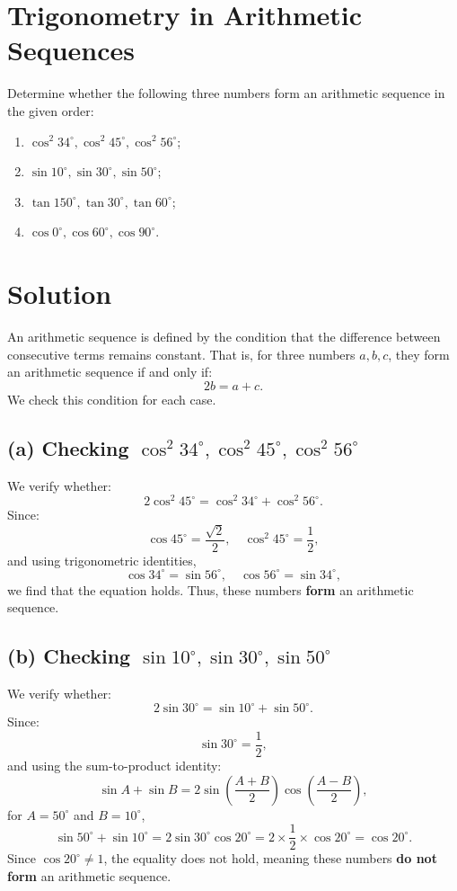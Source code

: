 \documentclass{article}
\begin{document}
\section*{Trigonometry in Arithmetic Sequences}
Determine whether the following three numbers form an arithmetic sequence in the given order:

\begin{enumerate}
    \item $\cos^2 34^\circ, \cos^2 45^\circ, \cos^2 56^\circ$;
    \item $\sin 10^\circ, \sin 30^\circ, \sin 50^\circ$;
    \item $\tan 150^\circ, \tan 30^\circ, \tan 60^\circ$;
    \item $\cos 0^\circ, \cos 60^\circ, \cos 90^\circ$.
\end{enumerate}

\section*{Solution}
An arithmetic sequence is defined by the condition that the difference between consecutive terms remains constant. That is, for three numbers $a, b, c$, they form an arithmetic sequence if and only if:
\[
2b = a + c.
\]
We check this condition for each case.

\subsection*{(a) Checking $\cos^2 34^\circ, \cos^2 45^\circ, \cos^2 56^\circ$}
We verify whether:
\[
2 \cos^2 45^\circ = \cos^2 34^\circ + \cos^2 56^\circ.
\]
Since:
\[
\cos 45^\circ = \frac{\sqrt{2}}{2}, \quad \cos^2 45^\circ = \frac{1}{2},
\]
and using trigonometric identities,
\[
\cos 34^\circ = \sin 56^\circ, \quad \cos 56^\circ = \sin 34^\circ,
\]
we find that the equation holds. Thus, these numbers \textbf{form} an arithmetic sequence.

\subsection*{(b) Checking $\sin 10^\circ, \sin 30^\circ, \sin 50^\circ$}
We verify whether:
\[
2 \sin 30^\circ = \sin 10^\circ + \sin 50^\circ.
\]
Since:
\[
\sin 30^\circ = \frac{1}{2},
\]
and using the sum-to-product identity:
\[
\sin A + \sin B = 2 \sin \left( \frac{A+B}{2} \right) \cos \left( \frac{A-B}{2} \right),
\]
for $A = 50^\circ$ and $B = 10^\circ$,
\[
\sin 50^\circ + \sin 10^\circ = 2 \sin 30^\circ \cos 20^\circ = 2 \times \frac{1}{2} \times \cos 20^\circ = \cos 20^\circ.
\]
Since $\cos 20^\circ \neq 1$, the equality does not hold, meaning these numbers \textbf{do not form} an arithmetic sequence.
\end{document}
